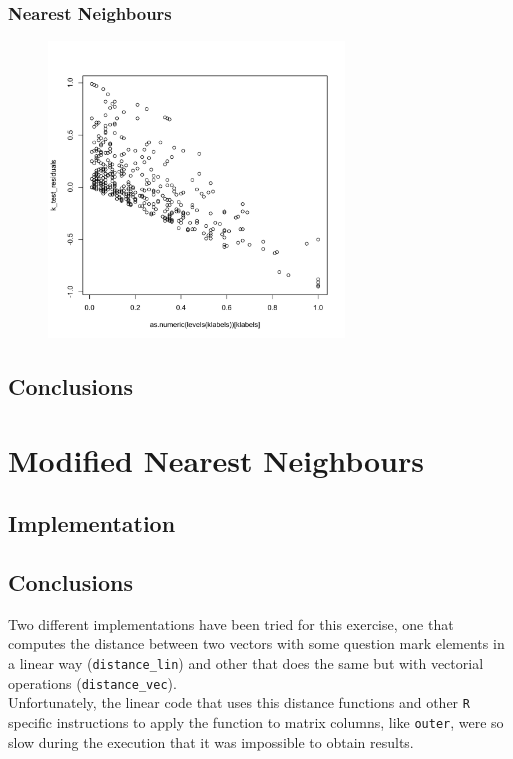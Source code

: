 \documentclass[12pt,a4paper]{article}
\begin{document}
\begin{singlespace}
\newpage
\subsubsection{Nearest Neighbours}
\vspace{-0.5cm}
\begin{figure}[h!]
    \centering
    \includegraphics[width=0.7\textwidth,trim= 0 0 20 30, clip]{Unk_NN_regression_residuals.pdf}
\end{figure}
\FloatBarrier

\subsection{Conclusions}

\section{Modified Nearest Neighbours}
\subsection{Implementation}


\vspace{-0.4cm}
\subsection{Conclusions}
Two different implementations have been tried for this exercise, one that computes the distance between two vectors with some question mark elements in a linear way (\texttt{distance\_lin}) and other that does the same but with vectorial operations (\texttt{distance\_vec}). \\

Unfortunately, the linear code that uses this distance functions and other \texttt{R} specific instructions to apply the function to matrix columns, like \texttt{outer}, were so slow during the execution that it was impossible to obtain results.

\end{singlespace}
\end{document}
